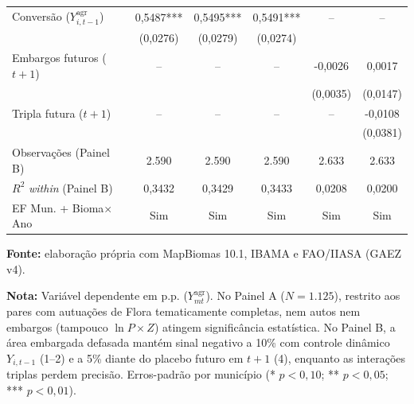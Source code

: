 \begin{table}[htbp]
\begin{tabular}{lccccc}
Conversão ($Y_{i,t-1}^{\text{agr}}$) & 0,5487*** & 0,5495*** & 0,5491*** & -- & -- \\
 & (0,0276) & (0,0279) & (0,0274) &  &  \\
Embargos futuros ($t+1$) & -- & -- & -- & -0,0026 & 0,0017 \\
 &  &  &  & (0,0035) & (0,0147) \\
Tripla futura ($t+1$) & -- & -- & -- & -- & -0,0108 \\
 &  &  &  &  & (0,0381) \\
\midrule
Observações (Painel B) & 2.590 & 2.590 & 2.590 & 2.633 & 2.633 \\
$R^2$ \textit{within} (Painel B) & 0,3432 & 0,3429 & 0,3433 & 0,0208 & 0,0200 \\
EF Mun. + Bioma$\times$Ano & Sim & Sim & Sim & Sim & Sim \\
\bottomrule
\end{tabular}
\par\smallskip\begin{minipage}{\textwidth}\footnotesize
\SingleSpacing
\noindent\textbf{Fonte:} elaboração própria com MapBiomas 10.1, IBAMA e FAO/IIASA (GAEZ v4).\par\medskip
\noindent\textbf{Nota:} Variável dependente em p.p. ($Y_{mt}^{\text{agr}}$). No Painel A ($N = 1.125$), restrito aos pares com autuações de Flora tematicamente completas, nem autos nem embargos (tampouco $\ln P \times Z$) atingem significância estatística. No Painel B, a área embargada defasada mantém sinal negativo a 10\% com controle dinâmico $Y_{i,t-1}$ (1--2) e a 5\% diante do placebo futuro em $t+1$ (4), enquanto as interações triplas perdem precisão. Erros-padrão por município (* $p<0{,}10$; ** $p<0{,}05$; *** $p<0{,}01$).
\end{minipage}
\end{table}
